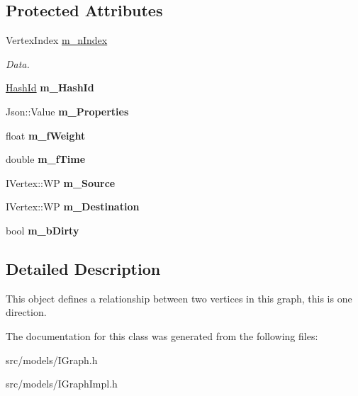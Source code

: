\subsection*{Protected Attributes}
\begin{DoxyCompactItemize}
\item 
\mbox{\label{class_i_graph_1_1_i_edge_aead9c969f0ee580883e9661e02afde57}} 
Vertex\+Index \hyperlink{class_i_graph_1_1_i_edge_aead9c969f0ee580883e9661e02afde57}{m\+\_\+n\+Index}
\begin{DoxyCompactList}\small\item\em Data. \end{DoxyCompactList}\item 
\mbox{\label{class_i_graph_1_1_i_edge_a28e27b75cd78266ce9b4a3d627e88569}} 
\hyperlink{class_i_graph_a27d53eee7b0a7abc9fce6c28983d5446}{Hash\+Id} {\bfseries m\+\_\+\+Hash\+Id}
\item 
\mbox{\label{class_i_graph_1_1_i_edge_a8e9312e5c48e3128ecd608d3ede6c25e}} 
Json\+::\+Value {\bfseries m\+\_\+\+Properties}
\item 
\mbox{\label{class_i_graph_1_1_i_edge_ac19d877b352a2e2b0ec1a98b8d8f511e}} 
float {\bfseries m\+\_\+f\+Weight}
\item 
\mbox{\label{class_i_graph_1_1_i_edge_a4c2574ba88d0886dd36ba3fb62d9d863}} 
double {\bfseries m\+\_\+f\+Time}
\item 
\mbox{\label{class_i_graph_1_1_i_edge_a9ddc78d60d3da6360d736047063bd882}} 
I\+Vertex\+::\+WP {\bfseries m\+\_\+\+Source}
\item 
\mbox{\label{class_i_graph_1_1_i_edge_ab02e6ac977013149917a6e9c2eb1988f}} 
I\+Vertex\+::\+WP {\bfseries m\+\_\+\+Destination}
\item 
\mbox{\label{class_i_graph_1_1_i_edge_aa0330614f2ec78e95e20048eef26a38a}} 
bool {\bfseries m\+\_\+b\+Dirty}
\end{DoxyCompactItemize}


\subsection{Detailed Description}
This object defines a relationship between two vertices in this graph, this is one direction. 

The documentation for this class was generated from the following files\+:\begin{DoxyCompactItemize}
\item 
src/models/I\+Graph.\+h\item 
src/models/I\+Graph\+Impl.\+h\end{DoxyCompactItemize}
